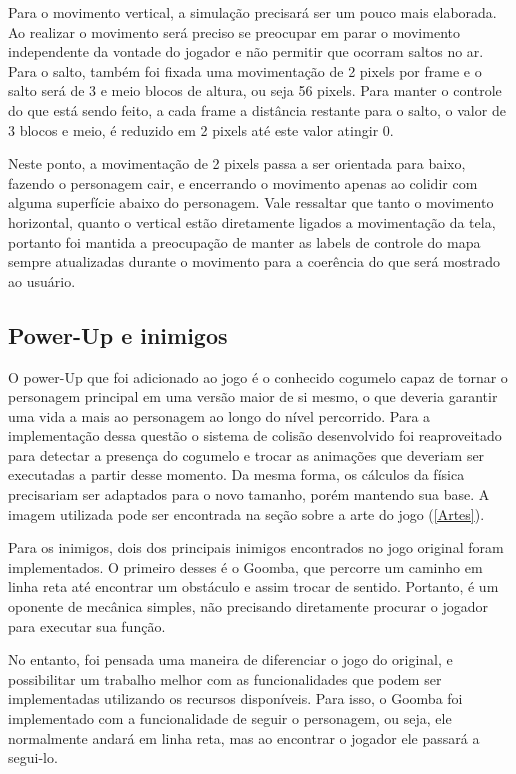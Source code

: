 \documentclass[11pt, twocolumn]{extarticle}
\begin{document}
Para o movimento vertical, a simulação precisará ser um pouco mais elaborada. Ao realizar o movimento será preciso se preocupar em parar o movimento independente da vontade do jogador e não permitir que ocorram saltos no ar. Para o salto, também foi fixada uma movimentação de 2 pixels por frame e o salto será de 3 e meio blocos de altura, ou seja 56 pixels. Para manter o controle do que está sendo feito, a cada frame a distância restante para o salto, o valor de 3 blocos e meio, é reduzido em 2 pixels até este valor atingir 0.

Neste ponto, a movimentação de 2 pixels passa a ser orientada para baixo, fazendo o personagem cair, e encerrando o movimento apenas ao colidir com alguma superfície abaixo do personagem. Vale ressaltar que tanto o movimento horizontal, quanto o vertical estão diretamente ligados a movimentação da tela, portanto foi mantida a preocupação de manter as labels de controle do mapa sempre atualizadas durante o movimento para a coerência do que será mostrado ao usuário.

\subsection{Power-Up e inimigos}
\indent \indent O power-Up que foi adicionado ao jogo é o conhecido cogumelo capaz de tornar o personagem principal em uma versão maior de si mesmo, o que deveria garantir uma vida a mais ao personagem ao longo do nível percorrido. Para a implementação dessa questão o sistema de colisão desenvolvido foi reaproveitado para detectar a presença do cogumelo e trocar as animações que deveriam ser executadas a partir desse momento. Da mesma forma, os cálculos da física precisariam ser adaptados para o novo tamanho, porém mantendo sua base. A imagem utilizada pode ser encontrada na seção sobre a arte do jogo (\ref{Artes}).

Para os inimigos, dois dos principais inimigos encontrados no jogo original foram implementados. O primeiro desses é o Goomba, que percorre um caminho em linha reta até encontrar um obstáculo e assim trocar de sentido. Portanto, é um oponente de mecânica simples, não precisando diretamente procurar o jogador para executar sua função.

No entanto, foi pensada uma maneira de diferenciar o jogo do original, e possibilitar um trabalho melhor com as funcionalidades que podem ser implementadas utilizando os recursos disponíveis. Para isso, o Goomba foi implementado com a funcionalidade de seguir o personagem, ou seja, ele normalmente andará em linha reta, mas ao encontrar o jogador ele passará a segui-lo.
\end{document}
